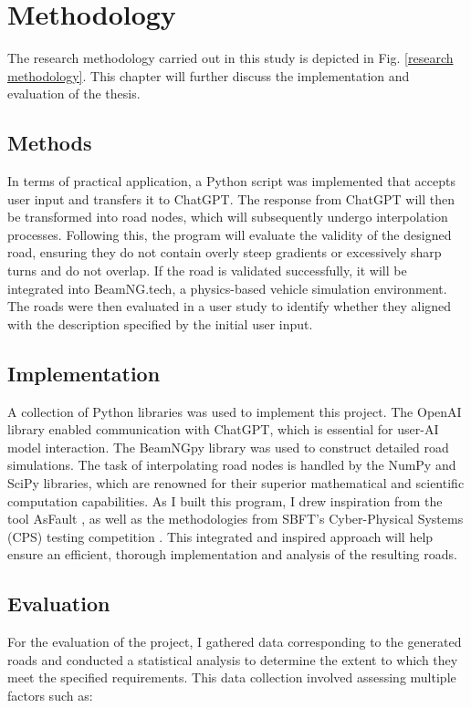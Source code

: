 \chapter{Methodology}
The research methodology carried out in this study is depicted in Fig. \ref{research methodology}. This chapter will further discuss the implementation and evaluation of the thesis.

\section{Methods}
In terms of practical application, a Python script was implemented that accepts user input and transfers it to ChatGPT. The response from ChatGPT will then be transformed into road nodes, which will subsequently undergo interpolation processes. Following this, the program will evaluate the validity of the designed road, ensuring they do not contain overly steep gradients or excessively sharp turns and do not overlap. If the road is validated successfully, it will be integrated into BeamNG.tech, a physics-based vehicle simulation environment. The roads were then evaluated in a user study to identify whether they aligned with the description specified by the initial user input.

\section{Implementation}
A collection of Python libraries was used to implement this project. The OpenAI library enabled communication with ChatGPT, which is essential for user-AI model interaction. The BeamNGpy library was used to construct detailed road simulations. The task of interpolating road nodes is handled by the NumPy and SciPy libraries, which are renowned for their superior mathematical and scientific computation capabilities. As I built this program, I drew inspiration from the tool AsFault \cite{GambiMF}, as well as the methodologies from SBFT’s Cyber-Physical Systems (CPS) testing competition \cite{SBFT}. This integrated and inspired approach will help ensure an efficient, thorough implementation and analysis of the resulting roads.

\section{Evaluation}
For the evaluation of the project, I gathered data corresponding to the generated roads and conducted a statistical analysis to determine the extent to which they meet the specified requirements. This data collection involved assessing multiple factors such as:

